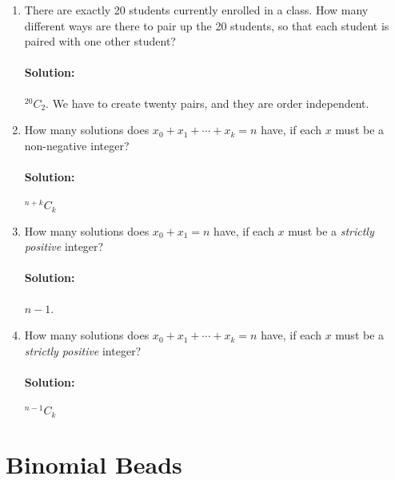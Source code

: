 \documentclass[11pt, notitlepage]{article}
\newcommand{\Question}[1]{\newpage\section{#1}}
\newcommand*{\Comb}[2]{{}^{#1}C_{#2}}%
\newenvironment{solution}{\paragraph{Solution:}}{\hfill}
\begin{document}
\begin{enumerate}[label=\alph*.)]
\item There are exactly 20 students currently enrolled in a class.
  How many different ways are there to pair up the 20 students, so
  that each student is paired with one other student?
\begin{solution}
	$\Comb{20}{2}$. We have to create twenty pairs, and they are order independent.
\end{solution}


  
\item How many solutions does $x_0 + x_1 + \cdots + x_k = n$ have, if each $x$ must be a non-negative integer?
\begin{solution}
	$\Comb{n+k}{k}$
\end{solution}
\item How many solutions does $x_0 + x_1 = n$ have, if each $x$ must be a \emph{strictly positive} integer?
\begin{solution}
	$n-1$.
\end{solution}
\item How many solutions does $x_0 + x_1 + \cdots + x_k = n$ have, if each $x$ must be a \emph{strictly positive} integer?
\begin{solution}
	$\Comb{n-1}{k}$
\end{solution}
\end{enumerate}


\Question{Binomial Beads}
\end{document}
